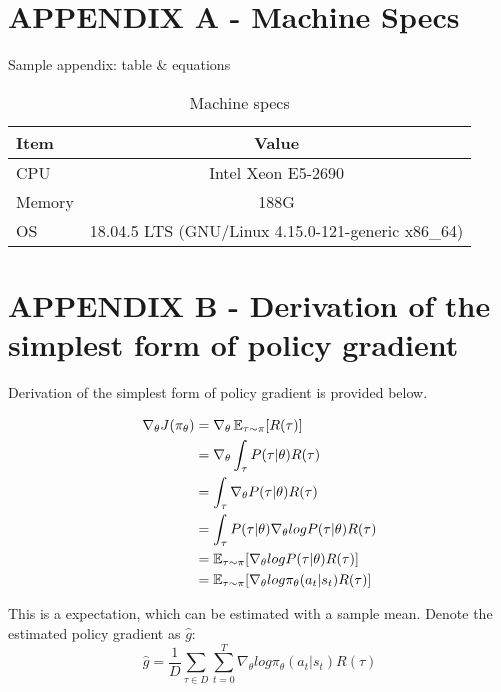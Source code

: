\chapter*{APPENDIX A - Machine Specs} 
Sample appendix: table & equations
\begin{table*} 
\begin{center} 
\caption{Machine specs}
{\normalsize
\begin{tabular}{l c}
\toprule
Item & Value \\
\midrule
    CPU & Intel Xeon E5-2690 \\ 
    Memory & 188G \\
    OS & 18.04.5 LTS (GNU/Linux 4.15.0-121-generic x86\_64) \\
\bottomrule
\end{tabular}
} \end{center} \end{table*}


\chapter*{APPENDIX B - Derivation of the simplest form of policy gradient}
Derivation of the simplest form of policy gradient is provided below.

\begin{equation*}
    \begin{aligned}[b]
        \nabla_\theta J(\pi_\theta) 
        & = \nabla_\theta \operatorname{\mathbb{E}}_{\tau \sim \pi} [R(\tau)] \\ 
        & = \nabla_\theta \int_\tau P(\tau|\theta) R(\tau)\\
        & =  \int_\tau \nabla_\theta P(\tau|\theta) R(\tau)\\
        & =  \int_\tau P(\tau|\theta) \nabla_\theta log P(\tau|\theta)R(\tau)\\
        & = \operatorname{\mathbb{E}}_{\tau \sim \pi} [\nabla_\theta log P(\tau|\theta)R(\tau)] \\
        & = \operatorname{\mathbb{E}}_{\tau \sim \pi} [\nabla_\theta log \pi_\theta (a_t | s_t)R(\tau)] \\
    \end{aligned}
\end{equation*}

    This is a expectation, which can be estimated with a sample mean. Denote the estimated policy gradient as $\hat{g}$: 
    $$   \hat{g} = \frac{1}{\mathit{D}} \sum_{\tau \in \mathit{D}} \sum_{t=0}^{T} \nabla_\theta log \pi_\theta (a_t | s_t)R(\tau)      $$












